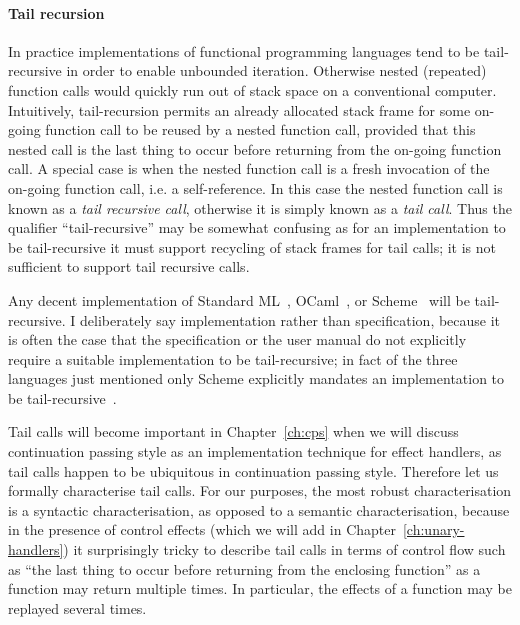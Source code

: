 \documentclass[12pt,phd,lfcs,twoside,openright,logo,leftchapter,normalheadings]{infthesis}
\theoremstyle{plain}
\theoremstyle{definition}
\begin{document}
\paragraph{Tail recursion}

In practice implementations of functional programming languages tend
to be tail-recursive in order to enable unbounded iteration. Otherwise
nested (repeated) function calls would quickly run out of stack space
on a conventional computer.
%
Intuitively, tail-recursion permits an already allocated stack frame
for some on-going function call to be reused by a nested function
call, provided that this nested call is the last thing to occur before
returning from the on-going function call.
%
A special case is when the nested function call is a fresh invocation
of the on-going function call, i.e. a self-reference. In this case the
nested function call is known as a \emph{tail recursive call},
otherwise it is simply known as a \emph{tail call}.
%
Thus the qualifier ``tail-recursive'' may be somewhat confusing as for
an implementation to be tail-recursive it must support recycling of
stack frames for tail calls; it is not sufficient to support tail
recursive calls.
%

Any decent implementation of Standard ML~\cite{MilnerTHM97},
OCaml~\cite{LeroyDFGRV20}, or Scheme~\cite{SperberDFSFM10} will be
tail-recursive. I deliberately say implementation rather than
specification, because it is often the case that the specification or
the user manual do not explicitly require a suitable implementation to
be tail-recursive; in fact of the three languages just mentioned only
Scheme explicitly mandates an implementation to be
tail-recursive~\cite{SperberDFSFM10}.
%

Tail calls will become important in Chapter~\ref{ch:cps} when we will
discuss continuation passing style as an implementation technique for
effect handlers, as tail calls happen to be ubiquitous in continuation
passing style.
%
Therefore let us formally characterise tail calls.
%
For our purposes, the most robust characterisation is a syntactic
characterisation, as opposed to a semantic characterisation, because
in the presence of control effects (which we will add in
Chapter~\ref{ch:unary-handlers}) it surprisingly tricky to describe
tail calls in terms of control flow such as ``the last thing to occur
before returning from the enclosing function'' as a function may
return multiple times. In particular, the effects of a function may be
replayed several times.
%
\end{document}
